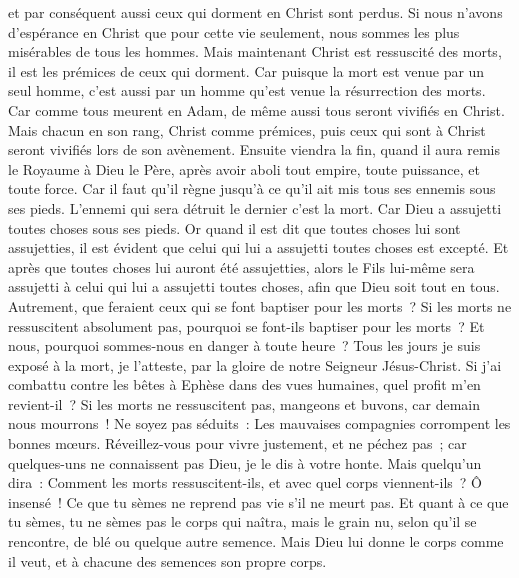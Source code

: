 \begin{multicols}{2}
et par conséquent aussi ceux qui dorment en Christ sont perdus.
Si nous n'avons d'espérance en Christ que pour cette vie seulement, nous sommes les plus misérables de tous les hommes.
Mais maintenant Christ est ressuscité des morts, il est les prémices de ceux qui dorment.
Car puisque la mort est venue par un seul homme, c'est aussi par un homme qu'est venue la résurrection des morts.
Car comme tous meurent en Adam, de même aussi tous seront vivifiés en Christ.
Mais chacun en son rang, Christ comme prémices, puis ceux qui sont à Christ seront vivifiés lors de son avènement.
Ensuite viendra la fin, quand il aura remis le Royaume à Dieu le Père, après avoir aboli tout empire, toute puissance, et toute force.
Car il faut qu'il règne jusqu'à ce qu'il ait mis tous ses ennemis sous ses pieds.
L'ennemi qui sera détruit le dernier c'est la mort.
Car Dieu a assujetti toutes choses sous ses pieds. Or quand il est dit que toutes choses lui sont assujetties, il est évident que celui qui lui a assujetti toutes choses est excepté.
Et après que toutes choses lui auront été assujetties, alors le Fils lui-même sera assujetti à celui qui lui a assujetti toutes choses, afin que Dieu soit tout en tous.
Autrement, que feraient ceux qui se font baptiser pour les morts~? Si les morts ne ressuscitent absolument pas, pourquoi se font-ils baptiser pour les morts~?
Et nous, pourquoi sommes-nous en danger à toute heure~?
Tous les jours je suis exposé à la mort, je l'atteste, par la gloire de notre Seigneur Jésus-Christ.
Si j'ai combattu contre les bêtes à Ephèse dans des vues humaines, quel profit m'en revient-il~? Si les morts ne ressuscitent pas, mangeons et buvons, car demain nous mourrons~!
Ne soyez pas séduits~: Les mauvaises compagnies corrompent les bonnes mœurs.
Réveillez-vous pour vivre justement, et ne péchez pas~; car quelques-uns ne connaissent pas Dieu, je le dis à votre honte.
Mais quelqu'un dira~: Comment les morts ressuscitent-ils, et avec quel corps viennent-ils~?
Ô insensé~! Ce que tu sèmes ne reprend pas vie s'il ne meurt pas.
Et quant à ce que tu sèmes, tu ne sèmes pas le corps qui naîtra, mais le grain nu, selon qu'il se rencontre, de blé ou quelque autre semence.
Mais Dieu lui donne le corps comme il veut, et à chacune des semences son propre corps.

\end{multicols}
